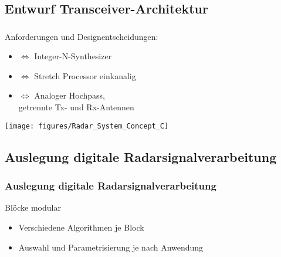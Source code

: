 \documentclass[16pt]{beamer}
\begin{document}
\subsection{Entwurf Transceiver-Architektur}
\begin{frame}
\frametitle{\insertsubsection}
Anforderungen und Designentscheidungen:
\vspace{0.2cm}
\begin{itemize}
	\item{ $\Leftrightarrow$ Integer-N-Synthesizer}
	\item{ $\Leftrightarrow$ Stretch Processor einkanalig}
	\item{ $\Leftrightarrow$ Analoger Hochpass,} \\
	\hspace{5.5cm} getrennte Tx- und Rx-Antennen
\end{itemize} 
\vspace{0.3cm}
\begin{center}
		\texttt{[image: figures/Radar\_System\_Concept\_C]}
\end{center}
 \end{frame}

\subsection{Auslegung digitale Radarsignalverarbeitung}
\begin{frame}
\frametitle{Auslegung digitale Radarsignalverarbeitung}
\vspace{-1cm}
	\begin{center}
		
	\end{center}
	\vspace{-0.3cm}
	Blöcke modular
	\begin{itemize}
		\item Verschiedene Algorithmen je Block
		\item Auswahl und Parametrisierung je nach Anwendung
	\end{itemize}
\end{frame} 
\end{document}
